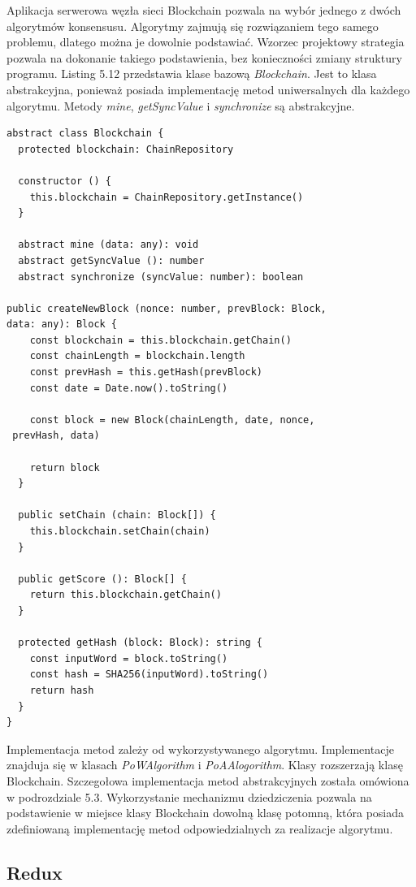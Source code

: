 \documentclass[a4paper,12pt]{book}
\begin{document}
Aplikacja serwerowa węzła sieci Blockchain pozwala na wybór jednego z dwóch algorytmów konsensusu. Algorytmy zajmują się rozwiązaniem tego samego problemu, dlatego można je dowolnie podstawiać. Wzorzec projektowy strategia pozwala na dokonanie takiego podstawienia, bez konieczności zmiany struktury programu. Listing 5.12 przedstawia klase bazową \textit{Blockchain}.
Jest to klasa abstrakcyjna, ponieważ posiada implementację metod uniwersalnych dla każdego algorytmu. Metody \textit{mine}, \textit{getSyncValue} i \textit{synchronize} są abstrakcyjne.

\begin{lstlisting}[style=ES6, caption={Klasa \textit{Blockchain}.}]
abstract class Blockchain {
  protected blockchain: ChainRepository

  constructor () {
    this.blockchain = ChainRepository.getInstance()
  }

  abstract mine (data: any): void
  abstract getSyncValue (): number
  abstract synchronize (syncValue: number): boolean

public createNewBlock (nonce: number, prevBlock: Block, 
data: any): Block {
    const blockchain = this.blockchain.getChain()
    const chainLength = blockchain.length
    const prevHash = this.getHash(prevBlock)
    const date = Date.now().toString()

    const block = new Block(chainLength, date, nonce,
 prevHash, data)

    return block
  }

  public setChain (chain: Block[]) {
    this.blockchain.setChain(chain)
  }

  public getScore (): Block[] {
    return this.blockchain.getChain()
  }

  protected getHash (block: Block): string {
    const inputWord = block.toString()
    const hash = SHA256(inputWord).toString()
    return hash
  }
}
\end{lstlisting}

Implementacja metod zależy od wykorzystywanego algorytmu. Implementacje znajduja się w klasach \textit{PoWAlgorithm} i \textit{PoAAlogorithm}. Klasy rozszerzają klasę Blockchain.
Szczegołowa implementacja metod abstrakcyjnych została omówiona w podrozdziale 5.3. Wykorzystanie mechanizmu dziedziczenia pozwala na podstawienie w miejsce klasy Blockchain dowolną klasę potomną, która posiada zdefiniowaną implementację metod odpowiedzialnych za realizacje algorytmu.

\subsection{Redux}
\end{document}
